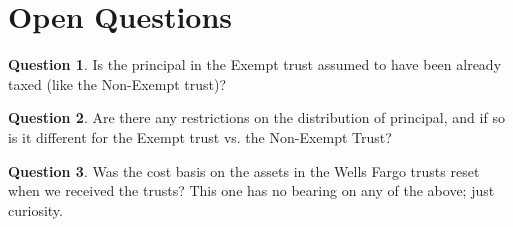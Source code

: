 \documentclass[11pt, oneside]{article}   	%
\theoremstyle{definition}
\newtheorem{question}{Question}[section]
\begin{document}
\section{Open Questions}
\label{sec:open_questions}

\begin{question}
Is the principal in the Exempt trust assumed to have been already taxed (like the Non-Exempt trust)? 
\end{question}

\begin{question}
Are there any restrictions on the distribution of principal, and if so is it different for the Exempt trust vs. the Non-Exempt Trust?
\end{question}

\begin{question}
Was the cost basis on the assets in the Wells Fargo trusts reset when we received the trusts? This one has no bearing on any of the above; just curiosity.
\end{question}




\end{document}
